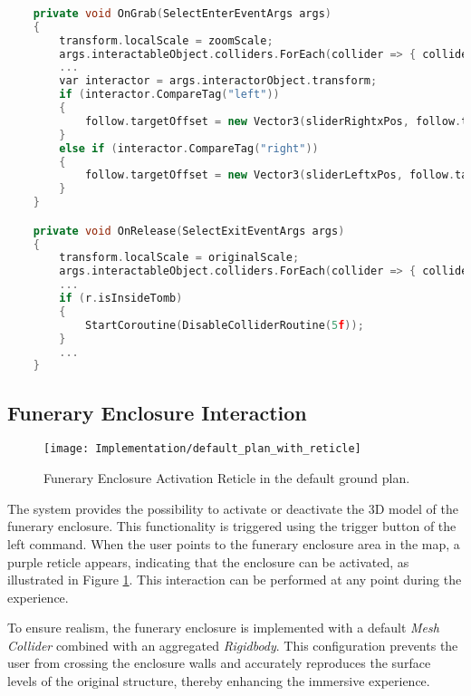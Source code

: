\begin{lstlisting}[language=C++, caption={Partial Fragment of objects onGrab and onRelease events.}, label={lst:grab_release}]
     
    private void OnGrab(SelectEnterEventArgs args)
    {
        transform.localScale = zoomScale;
        args.interactableObject.colliders.ForEach(collider => { collider.enabled = false; });
        ...
        var interactor = args.interactorObject.transform;
        if (interactor.CompareTag("left")) 
        {
            follow.targetOffset = new Vector3(sliderRightxPos, follow.targetOffset.y, follow.targetOffset.z);
        }
        else if (interactor.CompareTag("right")) 
        {
            follow.targetOffset = new Vector3(sliderLeftxPos, follow.targetOffset.y, follow.targetOffset.z);
        }
    }

    private void OnRelease(SelectExitEventArgs args)
    {
        transform.localScale = originalScale;
        args.interactableObject.colliders.ForEach(collider => { collider.enabled = true; });
        ...
        if (r.isInsideTomb)
        {
            StartCoroutine(DisableColliderRoutine(5f));
        }
        ...
    }
\end{lstlisting}


\subsection*{Funerary Enclosure Interaction}
\label{sec:funerary_interaction}

 \begin{figure}[h!]
    \centering
    \texttt{[image: Implementation/default\_plan\_with\_reticle]}
    \caption{Funerary Enclosure Activation Reticle in the default ground plan.}
    \label{fig:funerary_interaction}    
\end{figure}

The system provides the possibility to activate or deactivate the \gls{3D} model of the funerary enclosure.
This functionality is triggered using the trigger button of the left command. When the user points to the funerary enclosure area in the map, a purple reticle appears, indicating that the enclosure can be activated, as illustrated in Figure \ref{fig:funerary_interaction}. This interaction can be performed at any point during the experience.

To ensure realism, the funerary enclosure is implemented with a default \emph{Mesh Collider} combined with an aggregated \emph{Rigidbody}. This configuration prevents the user from crossing the enclosure walls and accurately reproduces the surface levels of the original structure, thereby enhancing the immersive experience.

